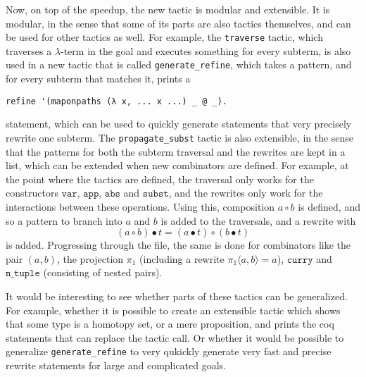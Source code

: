 Now, on top of the speedup, the new tactic is modular and extensible. It is modular, in the sense that some of its parts are also tactics themselves, and can be used for other tactics as well. For example, the \texttt{traverse} tactic, which traverses a $ \lambda $-term in the goal and executes something for every subterm, is also used in a new tactic that is called \texttt{generate\_refine}, which takes a pattern, and for every subterm that matches it, prints a
\begin{lstlisting}
refine '(maponpaths (λ x, ... x ...) _ @ _).
\end{lstlisting}
statement, which can be used to quickly generate statements that very precisely rewrite one subterm. The \texttt{propagate\_subst} tactic is also extensible, in the sense that the patterns for both the subterm traversal and the rewrites are kept in a list, which can be extended when new combinators are defined. For example, at the point where the tactics are defined, the traversal only works for the constructors $ \mathtt{var} $, $ \mathtt{app} $, $ \mathtt{abs} $ and $ \mathtt{subst} $, and the rewrites only work for the interactions between these operations. Using this, composition $ a \circ b $ is defined, and so a pattern to branch into $ a $ and $ b $ is added to the traversals, and a rewrite with
\[ (a \circ b) \bullet t = (a \bullet t) \circ (b \bullet t) \]
is added. Progressing through the file, the same is done for combinators like the pair $ (a, b) $, the projection $ \pi_1 $ (including a rewrite $ \pi_1 \langle a, b \rangle = a $), $ \mathtt{curry} $ and $ \mathtt{n\_tuple} $ (consisting of nested pairs).

It would be interesting to see whether parts of these tactics can be generalized. For example, whether it is possible to create an extensible tactic which shows that some type is a homotopy set, or a mere proposition, and prints the coq statements that can replace the tactic call. Or whether it would be possible to generalize \texttt{generate\_refine} to very qukickly generate very fast and precise rewrite statements for large and complicated goals.

